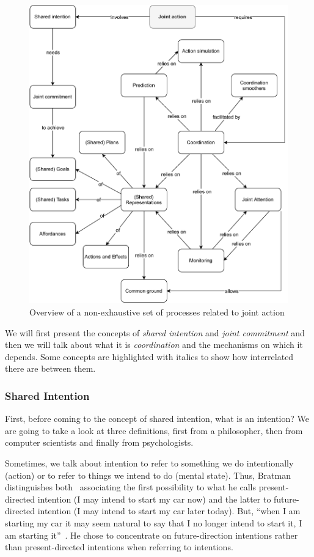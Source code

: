 \documentclass[a4paper,11pt,twoside]{StyleThese}
\begin{document}
\begin{figure}[!ht]
	\includegraphics[width=\linewidth]{figures/chapter1/joint_action.pdf}
	\caption{Overview of a non-exhaustive set of processes related to joint action}
	\label{chap1:fig:ja}
\end{figure}

We will first present the concepts of \emph{shared intention} and \emph{joint commitment} and then we will talk about what it is \emph{coordination} and the mechanisms on which it depends. Some concepts are highlighted with italics to show how interrelated there are between them.

\subsubsection{Shared Intention}
First, before coming to the concept of shared intention, what is an intention? We are going to take a look at three definitions, first from a philosopher, then from computer scientists and finally from psychologists. 

Sometimes, we talk about intention to refer to something we do intentionally (action) or to refer to things we intend to do (mental state). Thus, Bratman distinguishes both~\cite{bratman_1984_two} associating the first possibility to what he calls present-directed intention (I may intend to start my car now) and the latter to future-directed intention (I may intend to start my car later today). But, ``when I am starting my car it may seem natural to say that I no longer intend to start it, I am starting it''~\cite[p.~379]{bratman_1984_two}. He chose to concentrate on future-direction intentions rather than present-directed intentions when referring to intentions. 
\end{document}
